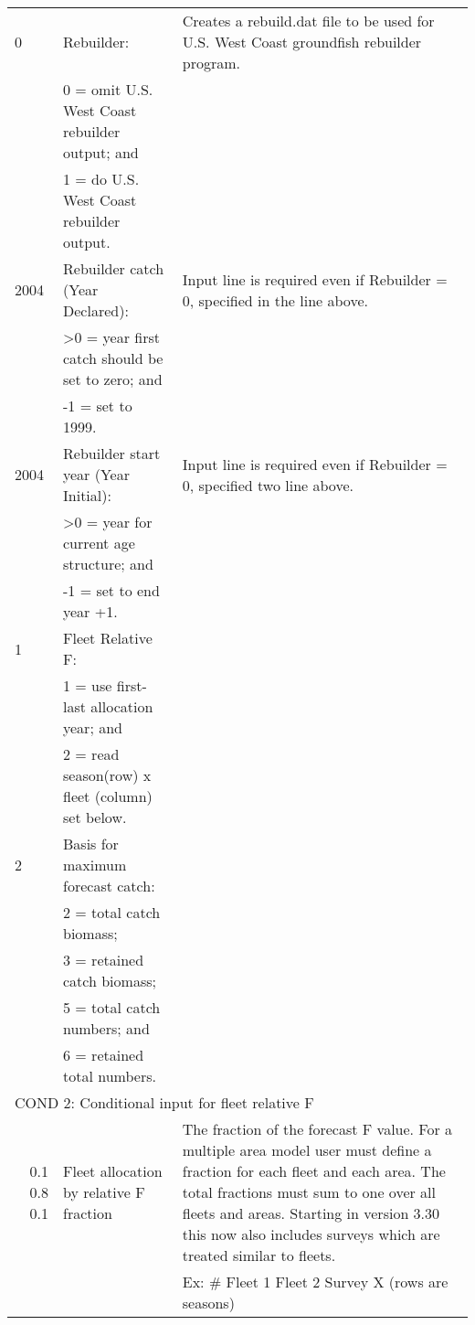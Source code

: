 \begin{landscape}
{\begin{longtable}{p{3.2cm} p{7cm} p{10.8cm}}
 \hline
 0 \Tstrut & Rebuilder: &\multirow{1}{1cm}[-0.25cm]{\parbox{11cm}{Creates a rebuild.dat file to be used for U.S. West Coast groundfish rebuilder program.}} \\
   & 0 = omit U.S. West Coast rebuilder output; and & \\
   & 1 = do U.S. West Coast rebuilder output. & \Bstrut\\
   
 \hline
 2004 & Rebuilder catch (Year Declared): & \multirow{1}{1cm}[-0.25cm]{\parbox{11cm}{Input line is required even if Rebuilder = 0, specified in the line above.}} \Tstrut\\
      & >0 = year first catch should be set to zero; and & \\
      & -1 = set to 1999. & \Bstrut\\
      
 \hline
 2004 & Rebuilder start year (Year Initial): & \multirow{1}{1cm}[-0.25cm]{\parbox{11cm}{Input line is required even if Rebuilder = 0, specified two line above.}} \Tstrut\\
      & >0 = year for current age structure; and & \\
      & -1 = set to end year +1. & \Bstrut\\
    
 \hline
 1 & Fleet Relative F: & \Tstrut\\
   & 1 = use first-last allocation year; and & \\
   & 2 = read season(row) x fleet (column) set below. & \Bstrut\\

 \hline 
 2 & Basis for maximum forecast catch: &  \Tstrut\\
   & 2 = total catch biomass; & \\
   & 3 = retained catch biomass; & \\
   & 5 = total catch numbers; and & \\
   & 6 = retained total numbers. & \Bstrut\\
    
 \hline 
 \multicolumn{3}{l}{COND 2: Conditional input for fleet relative F} \Tstrut\\
 \multicolumn{1}{r}{0.1 0.8 0.1}  & Fleet allocation by relative F fraction & The fraction of the forecast F value.  For a multiple area model user must define a fraction for each fleet and each area.  The total fractions must sum to one over all fleets and areas. Starting in version 3.30 this now also includes surveys which are treated similar to fleets.\\
   &  &  Ex: \# Fleet 1  Fleet 2  Survey X (rows are seasons) \Bstrut\\ 


\end{longtable}}
\end{landscape}
